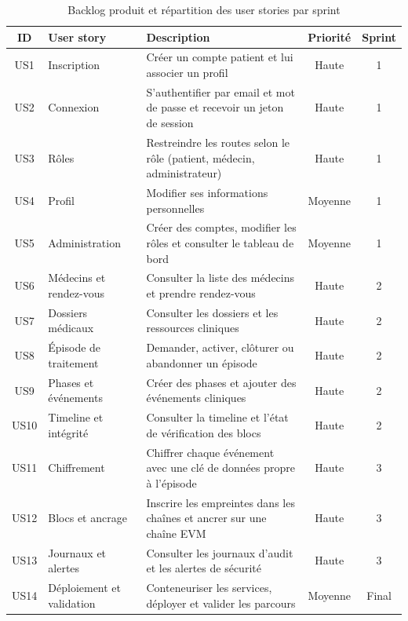 \begin{table}[H]
\centering
\small
\renewcommand{\arraystretch}{1.3}
\begin{tabularx}{\textwidth}{|c|p{3cm}|X|c|c|}
\hline
\textbf{ID} & \textbf{User story} & \textbf{Description} & \textbf{Priorité} & \textbf{Sprint} \\
\hline
US1  & Inscription & Créer un compte patient et lui associer un profil & Haute & 1 \\
\hline
US2  & Connexion & S'authentifier par email et mot de passe et recevoir un jeton de session & Haute & 1 \\
\hline
US3  & Rôles & Restreindre les routes selon le rôle (patient, médecin, administrateur) & Haute & 1 \\
\hline
US4  & Profil & Modifier ses informations personnelles & Moyenne & 1 \\
\hline
US5  & Administration & Créer des comptes, modifier les rôles et consulter le tableau de bord & Moyenne & 1 \\
\hline
US6  & Médecins et rendez-vous & Consulter la liste des médecins et prendre rendez-vous & Haute & 2 \\
\hline
US7  & Dossiers médicaux & Consulter les dossiers et les ressources cliniques & Haute & 2 \\
\hline
US8  & Épisode de traitement & Demander, activer, clôturer ou abandonner un épisode & Haute & 2 \\
\hline
US9  & Phases et événements & Créer des phases et ajouter des événements cliniques & Haute & 2 \\
\hline
US10 & Timeline et intégrité & Consulter la timeline et l'état de vérification des blocs & Haute & 2 \\
\hline
US11 & Chiffrement & Chiffrer chaque événement avec une clé de données propre à l'épisode & Haute & 3 \\
\hline
US12 & Blocs et ancrage & Inscrire les empreintes dans les chaînes et ancrer sur une chaîne EVM & Haute & 3 \\
\hline
US13 & Journaux et alertes & Consulter les journaux d'audit et les alertes de sécurité & Haute & 3 \\
\hline
US14 & Déploiement et validation & Conteneuriser les services, déployer et valider les parcours & Moyenne & Final \\
\hline
\end{tabularx}
\caption{Backlog produit et répartition des user stories par sprint}
\label{tab:backlog_produit}
\end{table}